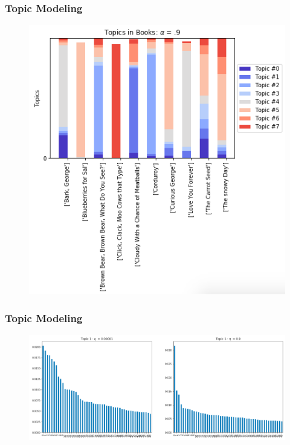 \documentclass{beamer}
\begin{document}
\begin{frame}
	\frametitle{Topic Modeling}
	\begin{figure}
		\includegraphics[width=.64\linewidth]{highalpha.png}
	\end{figure}
\end{frame}
\begin{frame}
	\frametitle{Topic Modeling}
	\begin{figure}
		\includegraphics[width=1\linewidth]{etadem.png}
	\end{figure}
\end{frame}
\end{document}
